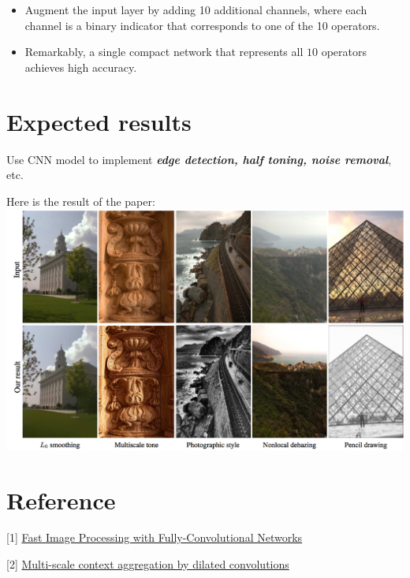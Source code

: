 \documentclass{article}
\newcommand{\tb}{\textbf}
\begin{document}
\begin{itemize}
    \item Augment the input layer by adding 10 additional channels, where each channel is a binary indicator that corresponds to one of the 10 operators.
    \item Remarkably, a single compact network that represents all $10$ operators achieves high accuracy.
\end{itemize}

\section*{Expected results}

Use CNN model to implement \textsl{\tb{edge detection, half toning, noise removal}}, etc.

Here is the result of the paper: \\

\includegraphics[width=\textwidth]{img/img.png}

\section*{Reference}

[1] \href{http://openaccess.thecvf.com/content_ICCV_2017/papers/Chen_Fast_Image_Processing_ICCV_2017_paper.pdf}{Fast Image Processing with Fully-Convolutional Networks}

[2] \href{https://arxiv.org/pdf/1511.07122.pdf}{Multi-scale context aggregation by dilated convolutions}
\end{document}
